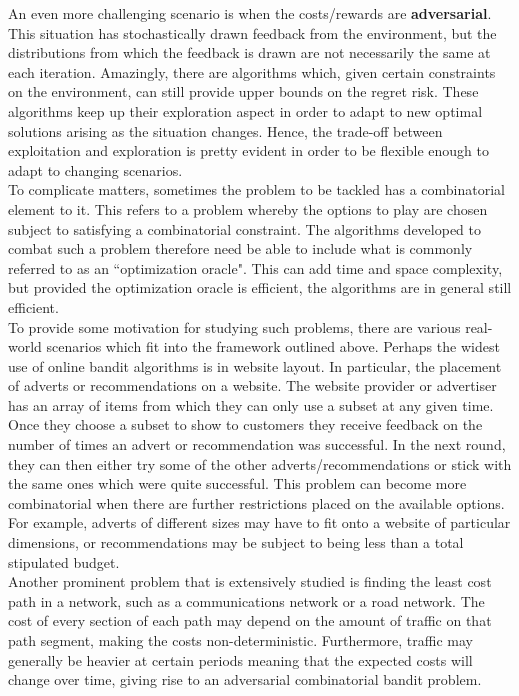 An even more challenging scenario is when the costs/rewards are \textbf{adversarial}. This situation has stochastically drawn feedback from the environment, but the distributions from which the feedback is drawn are not necessarily the same at each iteration. Amazingly, there are algorithms which, given certain constraints on the environment, can still provide upper bounds on the regret risk. These algorithms keep up their exploration aspect in order to adapt to new optimal solutions arising as the situation changes. Hence, the trade-off between exploitation and exploration is pretty evident in order to be flexible enough to adapt to changing scenarios.\\

To complicate matters, sometimes the problem to be tackled has a combinatorial element to it. This refers to a problem whereby the options to play are chosen subject to satisfying a combinatorial constraint. The algorithms developed to combat such a problem therefore need be able to include what is commonly referred to as an ``optimization oracle". This can add time and space complexity, but provided the optimization oracle is efficient, the algorithms are in general still efficient.\\

To provide some motivation for studying such problems, there are various real-world scenarios which fit into the framework outlined above. Perhaps the widest use of online bandit algorithms is in website layout. In particular, the placement of adverts or recommendations on a website. The website provider or advertiser has an array of items from which they can only use a subset at any given time. Once they choose a subset to show to customers they receive feedback on the number of times an advert or recommendation was successful. In the next round, they can then either try some of the other adverts/recommendations or stick with the same ones which were quite successful. This problem can become more combinatorial when there are further restrictions placed on the available options. For example, adverts of different sizes may have to fit onto a website of particular dimensions, or recommendations may be subject to being less than a total stipulated budget.\\

Another prominent problem that is extensively studied is finding the least cost path in a network, such as a communications network or a road network. The cost of every section of each path may depend on the amount of traffic on that path segment, making the costs non-deterministic. Furthermore, traffic may generally be heavier at certain periods meaning that the expected costs will change over time, giving rise to an adversarial combinatorial bandit problem.\\


